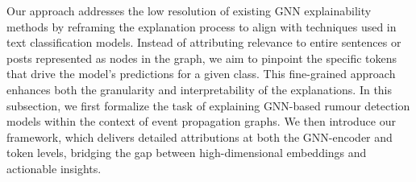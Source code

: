 
Our approach addresses the low resolution of existing GNN explainability methods by reframing the explanation process to align with techniques used in text classification models. Instead of attributing relevance to entire sentences or posts represented as nodes in the graph, we aim to pinpoint the specific tokens that drive the model's predictions for a given class. This fine-grained approach enhances both the granularity and interpretability of the explanations. In this subsection, we first formalize the task of explaining GNN-based rumour detection models within the context of event propagation graphs. We then introduce our framework, which delivers detailed attributions at both the GNN-encoder and token levels, bridging the gap between high-dimensional embeddings and actionable insights.

